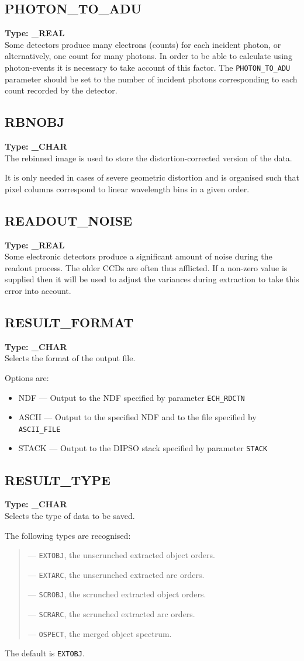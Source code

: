 \documentclass[11pt,twoside]{article}
\makeatletter
\newcommand{\stardocinitials}  {SUN}
\newcommand{\stardocnumber}    {152.4}
\newcommand{\stardocname}{\stardocinitials /\stardocnumber}
\newcommand{\htmlref}[2]{#1}
\newcommand{\xlabel}[1]{}
\newcommand{\indexcmdname}[1]{\index{#1@\protect\cmdname{#1}}}
\renewcommand{\indexcmdname}[1]{}
\newcommand{\cmdname}{\begingroup \catcode`\_=12 \realcmdname}
\newcommand{\realcmdname}[1]{\endgroup\texttt{#1}}
\newcommand{\echparameter}[4]
{
\item [#1 = #3] \mbox{}\label{par_#2}\indexcmdname{#2}
\\
#4
}
\renewcommand{\echparameter}[4]
{
  \subsection{\xlabel{par_#2}\label{par_#2}{\bf #1}}
  {\bf Type: #3}\\
#4
}
\makeatother
\begin{document}
\echparameter{PHOTON\_TO\_ADU}{PHOTON_TO_ADU}{
 \_REAL
}{
 Some detectors produce many electrons (counts) for each incident
 photon, or alternatively, one count for many photons.  In order to
 be able to calculate using photon-events it is necessary to take
 account of this factor.  The {\tt PHOTON\_TO\_ADU} parameter should be set
 to the number of incident photons corresponding to each count
 recorded by the detector.
}

\markboth{PARAMETERS: R}{\stardocname}
\echparameter{RBNOBJ}{RBNOBJ}{
 \_CHAR
}{
 The rebinned image is used to store the distortion-corrected version
 of the data.

 It is only needed in cases of severe geometric distortion and is
 organised such that pixel columns correspond to linear wavelength
 bins in a given order.
}

\echparameter{READOUT\_NOISE}{READOUT_NOISE}{
 \_REAL
}{
 Some electronic detectors produce a significant amount of noise
 during the readout process.  The older CCDs are often thus
 afflicted.  If a non-zero value is supplied then it will be used to
 adjust the variances during extraction to take this error into
 account.
}

\echparameter{RESULT\_FORMAT}{RESULT_FORMAT}{
 \_CHAR
}{
 Selects the format of the output file.

 Options are:

\begin{itemize}
   \item NDF --- Output to the NDF specified by parameter
         \htmlref{{\tt ECH\_RDCTN}}{par_ECH_RDCTN}
   \item ASCII --- Output to the specified NDF and to the file specified
             by \htmlref{{\tt ASCII\_FILE}}{par_ASCII_FILE}
   \item STACK --- Output to the DIPSO stack specified by parameter
             \htmlref{{\tt STACK}}{par_STACK}
\end{itemize}
}

\echparameter{RESULT\_TYPE}{RESULT_TYPE}{
 \_CHAR
}{
 Selects the type of data to be saved.

 The following types are recognised:

 \begin{quote}
    --- {\tt EXTOBJ}, the unscrunched extracted object orders.

    --- {\tt EXTARC}, the unscrunched extracted arc orders.

    --- {\tt SCROBJ}, the scrunched extracted object orders.

    --- {\tt SCRARC}, the scrunched extracted arc orders.

    --- {\tt OSPECT}, the merged object spectrum.
 \end{quote}

 The default is \texttt{EXTOBJ}.
}
\end{document}
